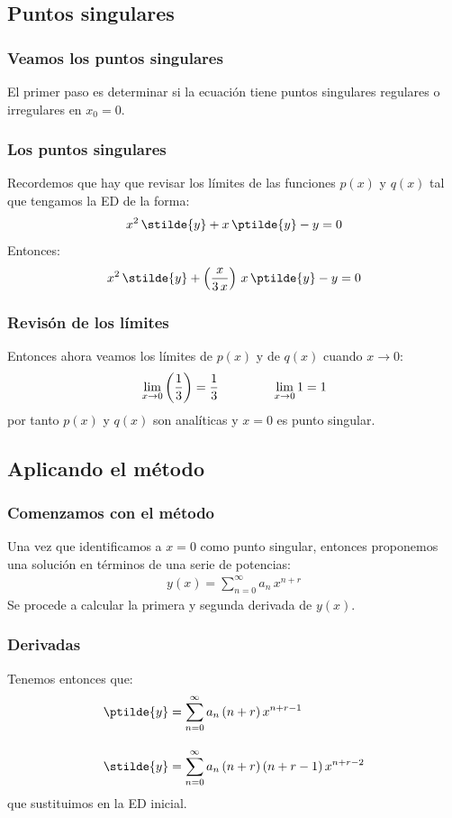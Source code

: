 \subsection{Puntos singulares}
\begin{frame}
\frametitle{Veamos los puntos singulares}
El primer paso es determinar si la ecuación tiene puntos singulares regulares o irregulares en $x_{0}=0$.
\end{frame}
\begin{frame}
\frametitle{Los puntos singulares}
Recordemos que hay que revisar los límites de las funciones $p(x)$ y $q(x)$ tal que tengamos la ED de la forma:
\begin{align*}
x^{2} \, \stilde{y} + x \, \ptilde{y} - y = 0
\end{align*}
\pause
Entonces:
\begin{align*}
x^{2} \, \stilde{y} + \left( \dfrac{x}{3 \, x} \right) \, x \, \ptilde{y} - y = 0
\end{align*}
\end{frame}
\begin{frame}
\frametitle{Revisón de los límites}
Entonces ahora veamos los límites de $p(x)$ y de $q(x)$ cuando $ x \to 0$:
\begin{align*}
\lim_{x \to 0} \left( \dfrac{1}{3} \right) = \dfrac{1}{3} \hspace{1.5cm} \lim_{x \to 0} 1 =  1
\end{align*}
por tanto $p(x)$ y $q(x)$ son analíticas y $x = 0$ es punto singular.
\end{frame}
\begin{frame}
\subsection{Aplicando el método}
\frametitle{Comenzamos con el método}
Una vez que identificamos a $x = 0$ como punto singular, entonces proponemos una solución en términos de una serie de potencias:
\begin{align*}
y(x) = \sum_{n=0}^{\infty} a_{n} \, x^{n+r}
\end{align*}
\pause
Se procede a calcular la primera y segunda derivada de $y(x)$.
\end{frame}
\begin{frame}
\frametitle{Derivadas}
Tenemos entonces que:
\begin{align*}
\ptilde{y} &= \sum_{n=0}^{\infty} a_{n} \, (n + r) \, x^{n+r-1} \\[1em]
\stilde{y} &= \sum_{n=0}^{\infty} a_{n} \, (n + r) \, (n+ r - 1) \, x^{n+r-2}
\end{align*}
que sustituimos en la ED inicial.
\end{frame}
